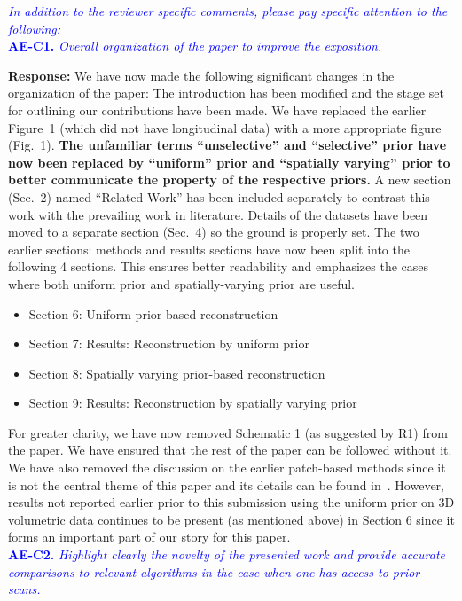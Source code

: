 \documentclass{article}
\begin{document}
\textcolor{blue}{\textit{In addition to the reviewer specific comments, please pay specific attention to the following:}}\\

\textcolor{blue}{\textbf{AE-C1.}\textit{ Overall organization of the paper to improve the exposition.}}

\textbf{Response:}
We have now made the following significant changes in the organization of the paper:
The introduction has been modified and the stage set for outlining our contributions have been made.  We have replaced the earlier Figure~1 (which did not have longitudinal data) with a more appropriate figure (Fig.~1). \textbf{The unfamiliar terms ``unselective'' and ``selective'' prior have now been replaced by ``uniform'' prior and ``spatially varying'' prior to better communicate the property of the respective priors.}
A new section  (Sec.~2) named ``Related Work'' has been included separately to contrast this work with the prevailing work in literature. 
Details of the datasets have been moved to a separate section (Sec.~4) so the ground is properly set.
The two earlier sections: methods and results sections have now been split into the following 4 sections. This ensures better readability and emphasizes the cases where both uniform prior and spatially-varying prior are useful.
\begin{itemize}
 \item Section 6: Uniform prior-based reconstruction
 \item Section 7: Results: Reconstruction by uniform prior
 \item Section 8: Spatially varying prior-based reconstruction
 \item Section 9: Results: Reconstruction by spatially varying prior
   \end{itemize}
For greater clarity, we have now removed Schematic 1 (as suggested by R1) from the paper. We have  ensured that the rest of the paper can be followed without it. We have also removed the discussion on the earlier patch-based methods since it is not the central theme of this paper and its details can be found in~\cite{my_dicta_paper}. However, results not reported earlier prior to this submission using the uniform prior on 3D volumetric data continues to be present (as mentioned above) in Section 6 since it forms an important part of our story for this paper.\\

\textcolor{blue}{\textbf{AE-C2.}\textit{ Highlight clearly the novelty of the presented work and provide accurate comparisons to relevant algorithms in the case when one has access to prior scans.}}
\end{document}
